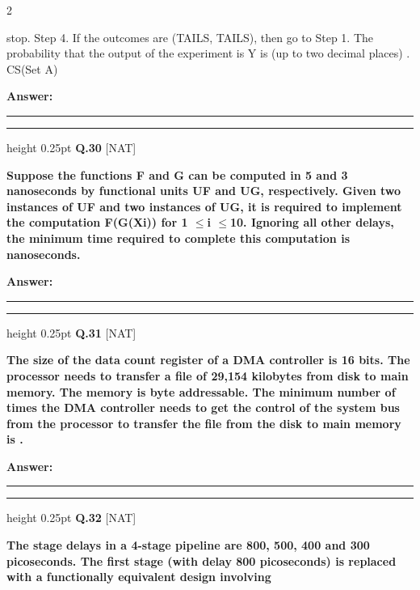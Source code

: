 \documentclass[a4paper,10pt,twoside]{article}
\begin{document}
\begin{multicols}{2}
{stop.
Step 4. If the outcomes are (TAILS, TAILS), then go to Step 1.
The probability that the output of the experiment is Y is (up to two decimal places)
.
CS(Set A) \par}
\par\vspace{3pt}\noindent\textbf{Answer:} \rule{3.2cm}{0.4pt}
\par\vspace{6pt}\hrule height 0.25pt\vspace{6pt}
\noindent\textbf{Q.30} \hfill {\footnotesize\textsf{[NAT]}}
\par\vspace{2pt}
{\bfseries Suppose the functions F and G can be computed in 5 and 3 nanoseconds by functional units
UF and UG, respectively. Given two instances of UF and two instances of UG, it is required to
implement the computation F(G(Xi)) for 1 $\le$i $\le$10. Ignoring all other delays, the minimum
time required to complete this computation is
nanoseconds. \par}
\par\vspace{3pt}\noindent\textbf{Answer:} \rule{3.2cm}{0.4pt}
\par\vspace{6pt}\hrule height 0.25pt\vspace{6pt}
\noindent\textbf{Q.31} \hfill {\footnotesize\textsf{[NAT]}}
\par\vspace{2pt}
{\bfseries The size of the data count register of a DMA controller is 16 bits. The processor needs to
transfer a ﬁle of 29,154 kilobytes from disk to main memory. The memory is byte addressable.
The minimum number of times the DMA controller needs to get the control of the system bus
from the processor to transfer the ﬁle from the disk to main memory is
. \par}
\par\vspace{3pt}\noindent\textbf{Answer:} \rule{3.2cm}{0.4pt}
\par\vspace{6pt}\hrule height 0.25pt\vspace{6pt}
\noindent\textbf{Q.32} \hfill {\footnotesize\textsf{[NAT]}}
\par\vspace{2pt}
{\bfseries The stage delays in a 4-stage pipeline are 800, 500, 400 and 300 picoseconds. The ﬁrst
stage (with delay 800 picoseconds) is replaced with a functionally equivalent design involving
}
\end{multicols}
\end{document}
